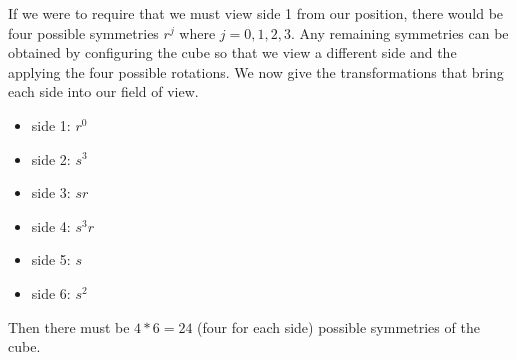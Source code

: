 \documentclass[11pt]{article}
\begin{document}
{        If we were to require that we must view side 1 from our position, there would be four possible symmetries $r^j$ where $j=0,1,2,3$.
        Any remaining symmetries can be obtained by configuring the cube so that we view a different side and the applying the four possible rotations.
        We now give the transformations that bring each side into our field of view.
        \begin{itemize}
            \item side 1: $r^0$
            \item side 2: $s^3$
            \item side 3: $sr$
            \item side 4: $s^3r$
            \item side 5: $s$
            \item side 6: $s^2$
        \end{itemize}
        Then there must be $4*6 = 24$ (four for each side) possible symmetries of the cube.
    }
\end{document}
